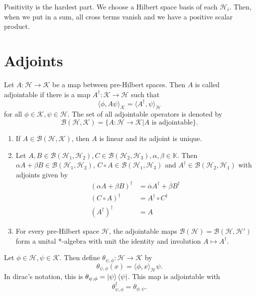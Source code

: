 \documentclass[twoside,symmetric, openany, 12pt]{./tuftebook}
\theoremstyle{definition}
\theoremstyle{definition}
\theoremstyle{definition}
\newenvironment{parts}{\begin{enumerate}[label=(\alph*)]}{\end{enumerate}}
\begin{document}
Positivity is the hardest part. We choose a Hilbert space basis of each $\mathcal{H}_i$. Then, when we put in a sum, all cross terms vanish and we have a positive scalar product.
\section{Adjoints}
\begin{Definition}[Adjoints]
	Let $A:\mathcal{H}\to \mathcal{K}$ be a map between pre-Hilbert spaces. Then $A$ is called adjointable if there is a map $A^\dagger:\mathcal{K}\to \mathcal{H}$ such that
	\[
		\langle \phi, A\psi\rangle_\mathcal{K}=\langle A^\dagger, \psi\rangle_\mathcal{H}
	\]
	for all $\phi\in \mathcal{K}, \psi\in \mathcal{H}$. The set of all adjointable operators is denoted by
	\[
		\mathcal{B}(\mathcal{H}, \mathcal{K})=\{A:\mathcal{H}\to \mathcal{K}|A\text{ is adjointable}\} 
	.\] 
\end{Definition}
\begin{Theorem}
	\begin{parts}
	\item If $A\in \mathcal{B}(\mathcal{H}, \mathcal{K})$, then $A$ is linear and its adjoint is unique.
	\item Let $A,B\in \mathcal{B}(\mathcal{H}_1, \mathcal{H}_2), C\in \mathcal{B}(\mathcal{H}_2, \mathcal{H}_3), \alpha, \beta\in \mathbb{K}$. Then $\alpha A + \beta B\in \mathcal{B}(\mathcal{H}_1, \mathcal{H}_2)$, $C\circ A\in \mathcal{B}(\mathcal{H}_1, \mathcal{H}_3)$ and $A^\dagger\in \mathcal{B}(\mathcal{H}_2, \mathcal{H}_1)$ with adjoints given by
		\begin{align*}
			(\alpha A + \beta B)^\dagger&=\overline{\alpha}A^\dagger+\overline{\beta}B^\dagger\\
			(C\circ A)^\dagger&=A^\dagger\circ C^\dagger\\
			(A^\dagger)^\dagger&= A
		\end{align*}
	\item For every pre-Hilbert space $\mathcal{H}$, the adjointable maps $\mathcal{B}(\mathcal{H})=\mathcal{B}(\mathcal{H}, \mathcal{H}')$ form a unital *-algebra with unit the identity and involution $A\mapsto A^\dagger$.
	\end{parts}
\end{Theorem}
\begin{Example}
	Let $\phi\in \mathcal{H}, \psi\in \mathcal{K}$. Then define $\theta_{\psi, \phi}:\mathcal{H}\to \mathcal{K}$ by
	\[
		\theta_{\psi, \phi}(x) = \langle \phi, x\rangle_\mathcal{H} \psi
	.\] 
	In dirac's notation, this is $\theta_{\psi, \phi}=\ket{\psi}\bra{\psi}$. This map is adjointable with
	\[
		\theta_{\psi, \phi}^\dagger = \theta_{\phi, \psi}
	.\] 
\end{Example}
\end{document}
